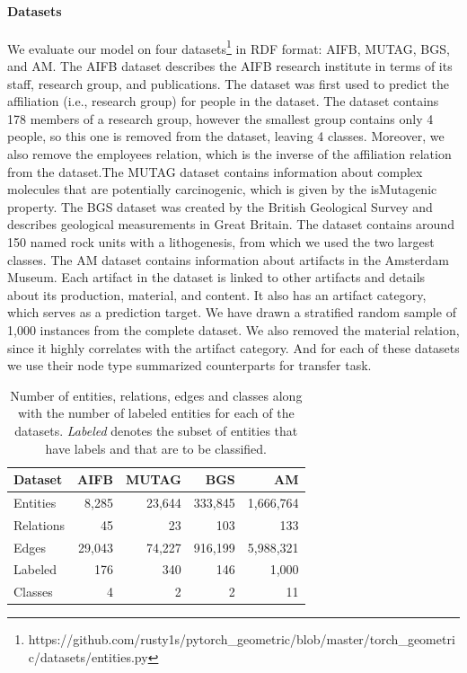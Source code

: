 \documentclass[11pt]{article}
\begin{document}
\paragraph{Datasets}
We evaluate our model on four datasets\footnote{https://github.com/rusty1s/pytorch\_geometric/blob/master/torch\_geometric/datasets/entities.py} in RDF format: AIFB, MUTAG, BGS, and AM. The AIFB dataset describes the AIFB research institute in terms of its staff, research group, and publications. The dataset was first used to predict the affiliation (i.e., research group) for people in the dataset. The dataset contains 178 members of a research group, however the smallest group contains only 4 people, so this one is removed from the dataset, leaving 4 classes. Moreover, we also remove the employees relation, which is the inverse of the affiliation relation from the dataset.The MUTAG dataset contains information about complex molecules that are potentially carcinogenic, which is given by the isMutagenic property. The BGS dataset was created by the British Geological Survey and describes geological measurements in Great Britain. The dataset contains around 150 named rock units with a lithogenesis, from which we used the two largest classes. The AM dataset contains information about artifacts in the Amsterdam Museum. Each artifact in the dataset is linked to other artifacts and details about its production, material, and content. It also
has an artifact category, which serves as a prediction target. We have drawn a stratified random sample of 1,000 instances from the complete dataset. We also removed the material relation, since it highly correlates with the artifact category. And for each of these datasets we use their node type summarized counterparts for transfer task.
\\
\begin{table}[htp!]
\centering
\begin{tabular}{lrrrr}
\toprule
Dataset & AIFB & MUTAG & BGS & AM  \\ \midrule
Entities    & 8,285 & 23,644 & 333,845 & 1,666,764 \\
Relations   & 45 & 23 & 103 & 133 \\
Edges   & 29,043 & 74,227 & 916,199& 5,988,321 \\
Labeled  & 176 & 340 & 146 &  1,000 \\
Classes  & 4 & 2 & 2 &  11 \\

 \bottomrule
\end{tabular}
\caption{Number of entities, relations, edges and classes along with the number of labeled entities for each of the datasets. \textit{Labeled} denotes the subset of entities that have labels and that are to be classified.}
\label{table:classification_datasets}
\end{table}
\end{document}
